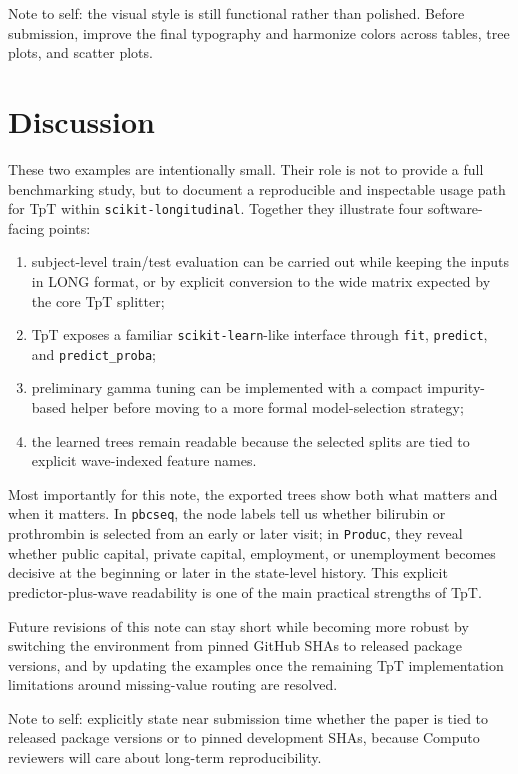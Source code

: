 \documentclass[
  letterpaper,
  DIV=11,
  numbers=noendperiod]{scrartcl}
\providecommand{\tightlist}{%
  \setlength{\itemsep}{0pt}\setlength{\parskip}{0pt}}
\begin{document}
{Note to self: the visual style is still functional rather than
polished. Before submission, improve the final typography and harmonize
colors across tables, tree plots, and scatter plots.}

\section{Discussion}\label{discussion}

These two examples are intentionally small. Their role is not to provide
a full benchmarking study, but to document a reproducible and
inspectable usage path for TpT within \texttt{scikit-longitudinal}.
Together they illustrate four software-facing points:

\begin{enumerate}
\def\labelenumi{\arabic{enumi}.}
\tightlist
\item
  subject-level train/test evaluation can be carried out while keeping
  the inputs in LONG format, or by explicit conversion to the wide
  matrix expected by the core TpT splitter;
\item
  TpT exposes a familiar \texttt{scikit-learn}-like interface through
  \texttt{fit}, \texttt{predict}, and \texttt{predict\_proba};
\item
  preliminary gamma tuning can be implemented with a compact
  impurity-based helper before moving to a more formal model-selection
  strategy;
\item
  the learned trees remain readable because the selected splits are tied
  to explicit wave-indexed feature names.
\end{enumerate}

Most importantly for this note, the exported trees show both what
matters and when it matters. In \texttt{pbcseq}, the node labels tell us
whether bilirubin or prothrombin is selected from an early or later
visit; in \texttt{Produc}, they reveal whether public capital, private
capital, employment, or unemployment becomes decisive at the beginning
or later in the state-level history. This explicit predictor-plus-wave
readability is one of the main practical strengths of TpT.

Future revisions of this note can stay short while becoming more robust
by switching the environment from pinned GitHub SHAs to released package
versions, and by updating the examples once the remaining TpT
implementation limitations around missing-value routing are resolved.

{Note to self: explicitly state near submission time whether the paper
is tied to released package versions or to pinned development SHAs,
because Computo reviewers will care about long-term reproducibility.}
\end{document}
